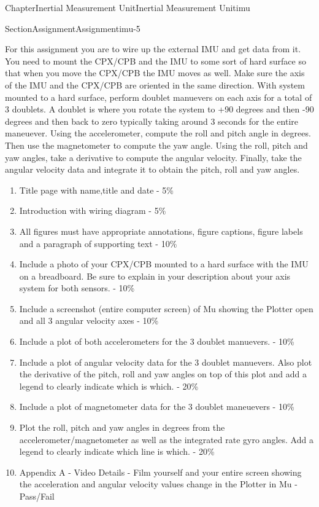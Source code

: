 \documentclass[oneside,10pt,]{book}
\numberwithin{equation}{section}
\begin{document}
\begin{chapterptx}{Chapter}{Inertial Measurement Unit}{}{Inertial Measurement Unit}{}{}{imu}
\begin{sectionptx}{Section}{Assignment}{}{Assignment}{}{}{imu-5}
\begin{introduction}{}%
For this assignment you are to wire up the external IMU and get data from it. You need to mount the CPX\slash{}CPB and the IMU to some sort of hard surface so that when you move the CPX\slash{}CPB the IMU moves as well. Make sure the axis of the IMU and the CPX\slash{}CPB are oriented in the same direction. With system mounted to a hard surface, perform doublet manuevers on each axis for a total of 3 doublets. A doublet is where you rotate the system to +90 degrees and then -90 degrees and then back to zero typically taking around 3 seconds for the entire maneuever. Using the accelerometer, compute the roll and pitch angle in degrees. Then use the magnetometer to compute the yaw angle. Using the roll, pitch and yaw angles, take a derivative to compute the angular velocity. Finally, take the angular velocity data and integrate it to obtain the pitch, roll and yaw angles.%
%
\begin{enumerate}
\item{}Title page with name,title and date - 5\%%
\item{}Introduction with wiring diagram - 5\%%
\item{}All figures must have appropriate annotations, figure captions, figure labels and a paragraph of supporting text - 10\%%
\item{}Include a photo of your CPX\slash{}CPB mounted to a hard surface with the IMU on a breadboard. Be sure to explain in your description about your axis system for both sensors. - 10\%%
\item{}Include a screenshot (entire computer screen) of Mu showing the Plotter open and all 3 angular velocity axes - 10\%%
\item{}Include a plot of both accelerometers for the 3 doublet manuevers. - 10\%%
\item{}Include a plot of angular velocity data for the 3 doublet manuevers. Also plot the derivative of the pitch, roll and yaw angles on top of this plot and add a legend to clearly indicate which is which. - 20\%%
\item{}Include a plot of magnetometer data for the 3 doublet maneuevers - 10\%%
\item{}Plot the roll, pitch and yaw angles in degrees from the accelerometer\slash{}magnetometer as well as the integrated rate gyro angles. Add a legend to clearly indicate which line is which. - 20\%%
\item{}Appendix A - Video Details - Film yourself and your entire screen showing the acceleration and angular velocity values change in the Plotter in Mu - Pass\slash{}Fail%

\end{enumerate}
\end{introduction}
\end{sectionptx}
\end{chapterptx}
\end{document}
